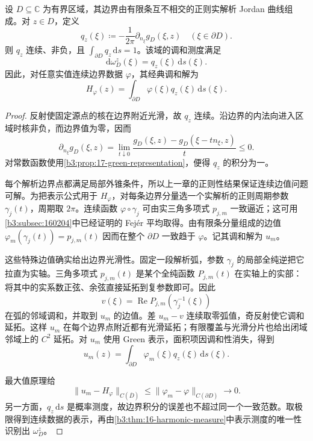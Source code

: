 \begin{proposition}[解析边界上的调和测度密度]\label{b3:prop:17-harmonic-measure-density}
设 \(D\subseteq\mathbb C\) 为有界区域，其边界由有限条互不相交的正则实解析 Jordan 曲线组成。对 \(z\in D\)，定义
\[
 q_z(\xi)\coloneqq-\frac1{2\pi}\partial_{n_\xi}g_D(\xi,z)
 \quad(\xi\in\partial D).
\]
则 \(q_z\) 连续、非负，且 \(\int_{\partial D}q_z\,\mathrm ds=1\)。该域的调和测度满足
\begin{equation}\label{b3:eq:17-harmonic-measure-density}
 \mathrm d\omega_D^z(\xi)=q_z(\xi)\,\mathrm ds(\xi).
\end{equation}
因此，对任意实值连续边界数据 \(\varphi\)，其经典调和解为
\[
 H_\varphi(z)=\int_{\partial D}\varphi(\xi)q_z(\xi)\,\mathrm ds(\xi).
\]
\end{proposition}
\begin{proof}
反射使固定源点的核在边界附近光滑，故 \(q_z\) 连续。沿边界的内法向进入区域时核非负，而边界值为零，因而
\[
 \partial_{n_\xi}g_D(\xi,z)
 =\lim_{t\downarrow0}\frac{g_D(\xi,z)-g_D(\xi-tn_\xi,z)}{t}\le0.
\]
对常数函数使用\cref{b3:prop:17-green-representation}，便得 \(q_z\) 的积分为一。

每个解析边界点都满足局部外锥条件，所以上一章的正则性结果保证连续边值问题可解。为把表示公式用于 \(H_\varphi\)，对每条边界分量选一个实解析的正则周期参数 \(\gamma_j(t)\)，周期取 \(2\pi\)。连续函数 \(\varphi\circ\gamma_j\) 可由实三角多项式 \(p_{j,m}\) 一致逼近；这可用\cref{b3:subsec:160204}中已经证明的 Fej\'er 平均取得。由有限条分量组成的边值 \(\varphi_m(\gamma_j(t))=p_{j,m}(t)\) 因而在整个 \(\partial D\) 一致趋于 \(\varphi\)。记其调和解为 \(u_m\)。

这些特殊边值确实给出边界光滑性。固定一段解析弧，参数 \(\gamma_j\) 的局部全纯逆把它拉直为实轴。三角多项式 \(p_{j,m}(t)\) 是某个全纯函数 \(P_{j,m}(t)\) 在实轴上的实部：将其中的实系数正弦、余弦直接延拓到复参数即可。因此
\[
 v(\xi)=\operatorname{Re}P_{j,m}(\gamma_j^{-1}(\xi))
\]
在弧的邻域调和，并取到 \(u_m\) 的边值。差 \(u_m-v\) 连续取零弧值，奇反射使它调和延拓。这样 \(u_m\) 在每个边界点附近都有光滑延拓；有限覆盖与光滑分片也给出闭域邻域上的 \(C^2\) 延拓。对 \(u_m\) 使用 Green 表示，面积项因调和性消失，得到
\[
 u_m(z)=\int_{\partial D}\varphi_m(\xi)q_z(\xi)\,\mathrm ds(\xi).
\]

最大值原理给
\[
 \|u_m-H_\varphi\|_{C(\overline D)}
 \le\|\varphi_m-\varphi\|_{C(\partial D)}\longrightarrow0.
\]
另一方面，\(q_z\,\mathrm ds\) 是概率测度，故边界积分的误差也不超过同一个一致范数。取极限得到连续数据的表示，再由\cref{b3:thm:16-harmonic-measure}中表示测度的唯一性识别出 \(\omega_D^z\)。
\end{proof}

